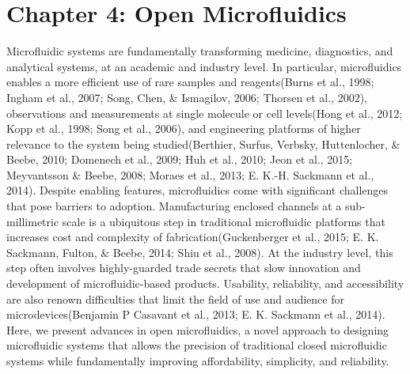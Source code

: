 \chapter{Chapter 4: Open Microfluidics}
\label{Chap:OpenMicrofluidics}

Microfluidic systems are fundamentally transforming medicine, diagnostics, and analytical systems, at an academic and industry level. In particular, microfluidics enables a more efficient use of rare samples and reagents(Burns et al., 1998; Ingham et al., 2007; Song, Chen, \& Ismagilov, 2006; Thorsen et al., 2002), observations and measurements at single molecule or cell levels(Hong et al., 2012; Kopp et al., 1998; Song et al., 2006), and engineering platforms of higher relevance to the system being studied(Berthier, Surfus, Verbsky, Huttenlocher, \& Beebe, 2010; Domenech et al., 2009; Huh et al., 2010; Jeon et al., 2015; Meyvantsson \& Beebe, 2008; Moraes et al., 2013; E. K.-H. Sackmann et al., 2014). Despite enabling features, microfluidics come with significant challenges that pose barriers to adoption. Manufacturing enclosed channels at a sub-millimetric scale is a ubiquitous step in traditional microfluidic platforms that increases cost and complexity of fabrication(Guckenberger et al., 2015; E. K. Sackmann, Fulton, \& Beebe, 2014; Shiu et al., 2008). At the industry level, this step often involves highly-guarded trade secrets that slow innovation and development of microfluidic-based products. Usability, reliability, and accessibility are also renown difficulties that limit the field of use and audience for microdevices(Benjamin P Casavant et al., 2013; E. K. Sackmann et al., 2014). Here, we present advances in open microfluidics, a novel approach to designing microfluidic systems that allows the precision of traditional closed microfluidic systems while fundamentally improving affordability, simplicity, and reliability.
